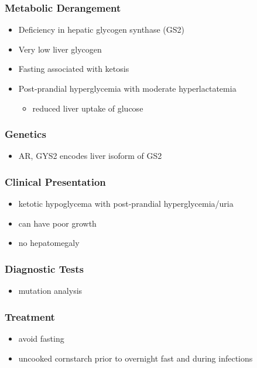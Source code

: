\documentclass{scrartcl}
\begin{document}
\subsubsection{Metabolic Derangement}
\label{sec:orgfd09a78}
\begin{itemize}
\item Deficiency in hepatic glycogen synthase (GS2)
\item Very low liver glycogen
\item Fasting associated with ketosis
\item Post-prandial hyperglycemia with moderate hyperlactatemia
\begin{itemize}
\item reduced liver uptake of glucose
\end{itemize}
\end{itemize}

\subsubsection{Genetics}
\label{sec:orgc8d6750}
\begin{itemize}
\item AR, GYS2 encodes liver isoform of GS2
\end{itemize}

\subsubsection{Clinical Presentation}
\label{sec:org0a9eb5c}
\begin{itemize}
\item ketotic hypoglycema with post-prandial hyperglycemia/uria
\item can have poor growth
\item no hepatomegaly
\end{itemize}

\subsubsection{Diagnostic Tests}
\label{sec:orgf85d004}
\begin{itemize}
\item mutation analysis
\end{itemize}
\subsubsection{Treatment}
\label{sec:orgad39b2b}
\begin{itemize}
\item avoid fasting
\item uncooked cornstarch prior to overnight fast and during infections
\end{itemize}
\end{document}
